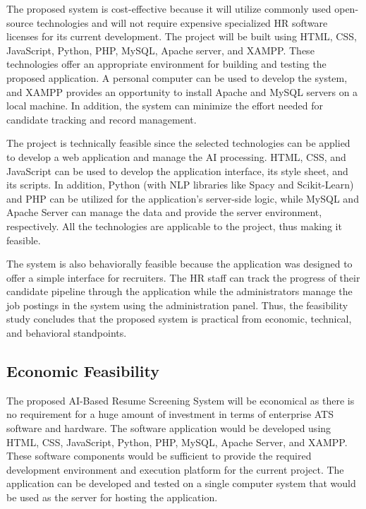 \documentclass[12pt,a4paper]{report}
\begin{document}
The proposed system is cost-effective because it will utilize commonly used open-source technologies and will not require expensive specialized HR software licenses for its current development. The project will be built using HTML, CSS, JavaScript, Python, PHP, MySQL, Apache server, and XAMPP. These technologies offer an appropriate environment for building and testing the proposed application. A personal computer can be used to develop the system, and XAMPP provides an opportunity to install Apache and MySQL servers on a local machine. In addition, the system can minimize the effort needed for candidate tracking and record management.

The project is technically feasible since the selected technologies can be applied to develop a web application and manage the AI processing. HTML, CSS, and JavaScript can be used to develop the application interface, its style sheet, and its scripts. In addition, Python (with NLP libraries like Spacy and Scikit-Learn) and PHP can be utilized for the application’s server-side logic, while MySQL and Apache Server can manage the data and provide the server environment, respectively. All the technologies are applicable to the project, thus making it feasible.

The system is also behaviorally feasible because the application was designed to offer a simple interface for recruiters. The HR staff can track the progress of their candidate pipeline through the application while the administrators manage the job postings in the system using the administration panel. Thus, the feasibility study concludes that the proposed system is practical from economic, technical, and behavioral standpoints.

\subsection{Economic Feasibility}

The proposed AI-Based Resume Screening System will be economical as there is no requirement for a huge amount of investment in terms of enterprise ATS software and hardware. The software application would be developed using HTML, CSS, JavaScript, Python, PHP, MySQL, Apache Server, and XAMPP. These software components would be sufficient to provide the required development environment and execution platform for the current project. The application can be developed and tested on a single computer system that would be used as the server for hosting the application.
\end{document}
